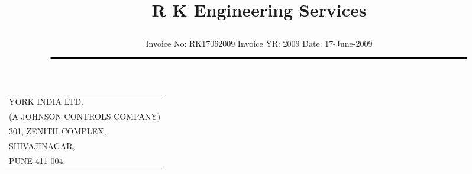 \documentclass[11pt]{article}
\title{\vspace*{-1.5cm} \centerline{ \Huge \bf \hspace{0cm} R K Engineering Services}\vspace*{-0.75cm}}
\author{%
 \scriptsize Invoice No: RK17062009  \hspace*{4cm}  Invoice YR: 2009 \hspace*{4cm} Date: 17-June-2009\\
$\rule{7.0in}{0.5mm}$}
\date{}
\begin{document}
\maketitle
\thispagestyle{empty}
\vspace*{-1cm}	
\begin{flushleft}
{\footnotesize
\begin{tabular}{l}
YORK INDIA LTD.\\
(A JOHNSON CONTROLS COMPANY)\\
301, ZENITH COMPLEX, \\
 SHIVAJINAGAR,\\
PUNE 411 004.
\end{tabular}
}
\end{flushleft}

\vspace*{1cm}

\vspace*{-1cm}

\end{document}
